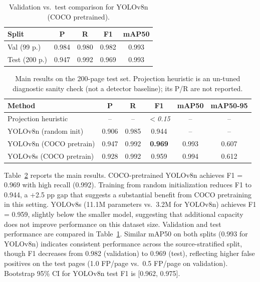 \documentclass[pdflatex,sn-mathphys-num]{sn-jnl}
\begin{document}
\begin{table}[t]
\centering
\scriptsize\setlength{\tabcolsep}{3pt}
\caption{Validation vs.\ test comparison for YOLOv8n (COCO pretrained).}
\label{tab:val_test}
\begin{tabular}{lcccc}
\toprule
Split & P & R & F1 & mAP50 \\
\midrule
Val (99 p.)  & 0.984 & 0.980 & 0.982 & 0.993 \\
Test (200 p.) & 0.947 & 0.992 & 0.969 & 0.993 \\
\bottomrule
\end{tabular}
\end{table}

\begin{table}[t]
\centering
\scriptsize\setlength{\tabcolsep}{3pt}
\caption{Main results on the 200-page test set. Projection heuristic is an un-tuned diagnostic sanity check (not a detector baseline); its P/R are not reported.}
\label{tab:results}
\begin{tabular}{lccccc}
\toprule
Method & P & R & F1 & mAP50 & mAP50-95 \\
\midrule
Projection heuristic   & -- & -- & \textit{$<$0.15} & -- & -- \\
YOLOv8n (random init)  & 0.906 & 0.985 & 0.944 & -- & -- \\
YOLOv8n (COCO pretrain) & 0.947 & 0.992 & \textbf{0.969} & 0.993 & 0.607 \\
YOLOv8s (COCO pretrain) & 0.928 & 0.992 & 0.959 & 0.994 & 0.612 \\
\bottomrule
\end{tabular}
\end{table}

Table~\ref{tab:results} reports the main results. COCO-pretrained YOLOv8n achieves F1 = 0.969 with high recall (0.992). Training from random initialization reduces F1 to 0.944, a $+$2.5 pp gap that suggests a substantial benefit from COCO pretraining in this setting. YOLOv8s (11.1M parameters vs.\ 3.2M for YOLOv8n) achieves F1 = 0.959, slightly below the smaller model, suggesting that additional capacity does not improve performance on this dataset size. Validation and test performance are compared in Table~\ref{tab:val_test}. Similar mAP50 on both splits (0.993 for YOLOv8n) indicates consistent performance across the source-stratified split, though F1 decreases from 0.982 (validation) to 0.969 (test), reflecting higher false positives on the test pages (1.0 FP/page vs.\ 0.5 FP/page on validation). Bootstrap 95\% CI for YOLOv8n test F1 is [0.962, 0.975].
\end{document}
